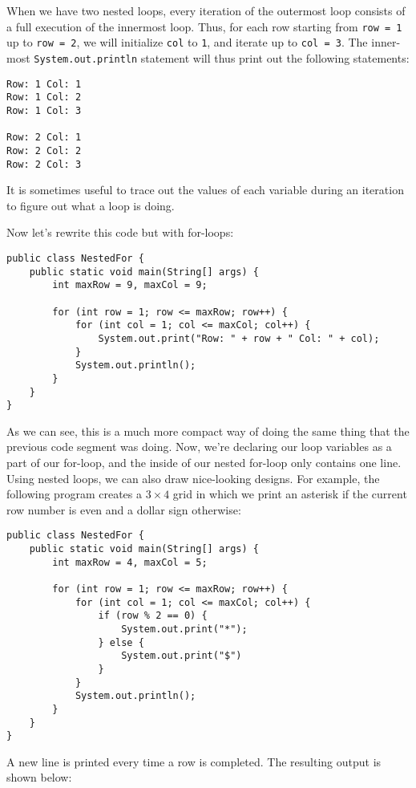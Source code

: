 When we have two nested loops, every iteration of the outermost loop consists of a full execution of the innermost loop. Thus, for each row starting from \verb!row = 1! up to \verb!row = 2!, we will initialize \verb!col! to \verb!1!, and iterate up to \verb!col = 3!. The inner-most \verb!System.out.println! statement will thus print out the following statements:

\begin{lstlisting}
Row: 1 Col: 1
Row: 1 Col: 2
Row: 1 Col: 3

Row: 2 Col: 1
Row: 2 Col: 2
Row: 2 Col: 3
\end{lstlisting}

It is sometimes useful to trace out the values of each variable during an iteration to figure out what a loop is doing.


Now let's rewrite this code but with for-loops: 


\begin{lstlisting}
public class NestedFor {
	public static void main(String[] args) {
		int maxRow = 9, maxCol = 9;

		for (int row = 1; row <= maxRow; row++) {
			for (int col = 1; col <= maxCol; col++) {
				System.out.print("Row: " + row + " Col: " + col);
			}
			System.out.println();
		}
	}
}
\end{lstlisting}

As we can see, this is a much more compact way of doing the same thing that the previous code segment was doing. Now, we're declaring our loop variables as a part of our for-loop, and the inside of our nested for-loop only contains one line. \\


Using nested loops, we can also draw nice-looking designs. For example, the following program creates a $3\times 4$ grid in which we print an asterisk if the current row number is even and a dollar sign otherwise:

\begin{lstlisting}
public class NestedFor {
	public static void main(String[] args) {
		int maxRow = 4, maxCol = 5;

		for (int row = 1; row <= maxRow; row++) {
			for (int col = 1; col <= maxCol; col++) {
				if (row % 2 == 0) {
				    System.out.print("*");
				} else {
				    System.out.print("$")
				}
			}
			System.out.println();
		}
	}
}
\end{lstlisting}

A new line is printed every time a row is completed. The resulting output is shown below:

